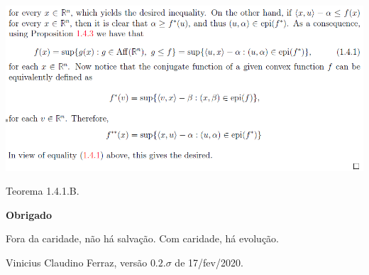 \documentclass[12pt]{article}
\begin{document}
		\begin{center}
		\includegraphics{11}
		\end{center}

Teorema 1.4.1.B.

\vspace{12mm}

\Large

\begin{center}
\textbf{Obrigado}
\end{center}

\large

\vspace{12mm}

Fora da caridade, n\~ao h\'a salva\c{c}\~ao. Com caridade, h\'a evolu\c{c}\~ao.

Vinicius Claudino Ferraz, vers\~ao $0.2.\sigma$ de 17/fev/2020.
\end{document}
